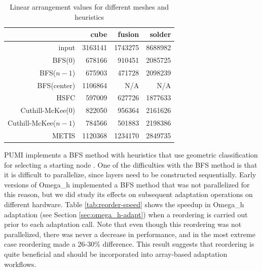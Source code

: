 \begin{table}
\caption{Linear arrangement values for different meshes and heuristics}
\label{tab:la}
\begin{center}
\begin{tabular}{r|rrr}
                     &    cube &   fusion &   solder \\\hline
input                & 3163141 &  1743275 &  8688982 \\
BFS($0$)             &  678166 &   910451 &  2085725 \\
BFS($n-1$)           &  675903 &   471728 &  2098239 \\
BFS(center)          & 1106864 &      N/A &      N/A \\
HSFC                 &  597009 &   627726 &  1877633 \\
Cuthill-McKee($0$)   &  822050 &   956364 &  2161626 \\
Cuthill-McKee($n-1$) &  784566 &   501883 &  2198386 \\
METIS                & 1120368 &  1234170 &  2849735 \\
\end{tabular}
\end{center}
\end{table}

PUMI implements a BFS method with heuristics that use geometric
classification for selecting a starting node
\cite{zhou2010adjacency, beall1997general}.
One of the difficulties with the BFS method is that it is difficult
to parallelize, since layers need to be constructed sequentially.
Early versions of Omega\_h implemented a BFS method that was not
parallelized for this reason, but we did study its effects on subsequent
adaptation operations on different hardware.
Table \ref{tab:reorder-speed} shows the speedup in Omega\_h adaptation
(see Section \ref{sec:omega_h-adapt}) when a reordering is carried out
prior to each adaptation call.
Note that even though this reordering was not parallelized, there
was never a decrease in performance, and in the most extreme case
reordering made a 26-30\% difference.
This result suggests that reordering is quite beneficial and should
be incorporated into array-based adaptation workflows.

